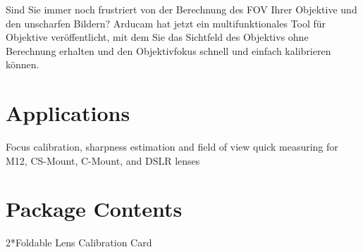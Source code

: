 Sind Sie immer noch frustriert von der Berechnung des FOV Ihrer Objektive und den unscharfen Bildern? Arducam hat jetzt ein multifunktionales Tool für Objektive veröffentlicht, mit dem Sie das Sichtfeld des Objektivs ohne Berechnung erhalten und den Objektivfokus schnell und einfach kalibrieren können.

\section{Applications}

Focus calibration, sharpness estimation and field of view quick measuring for M12, CS-Mount, C-Mount, and DSLR lenses

\section{Package Contents}

2*Foldable Lens Calibration Card

